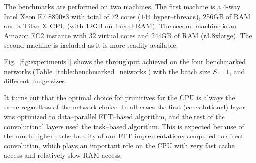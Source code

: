 \documentclass[conference]{./IEEEtran}
\begin{document}
  The benchmarks are performed on two machines.  The first machine is
  a 4-way Intel Xeon E7 8890v3 with total of $72$ cores ($144$
  hyper--threads), 256GB of RAM and a Titan X GPU (with 12GB on--board
  RAM).  The second machine is an Amazon EC2 instance with $32$
  virtual cores and 244GB of RAM (r3.8xlarge).  The second machine is
  included as it is more readily available.

  Fig.~\ref{fig:experiments1} shows the throughput achieved on the
  four benchmarked networks (Table~\ref{table:benchmarked_networks})
  with the batch size $S=1$, and different image sizes.

  It turns out that the optimal choice for primitives for the CPU is
  always the same regardless of the network choice.  In all cases the
  first (convolutional) layer was optimized to data--parallel
  FFT--based algorithm, and the rest of the convolutional layers used
  the task--based algorithm.  This is expected because of the much
  higher cache locality of our FFT implementations compared to direct
  convolution, which plays an important role on the CPU with very fast
  cache access and relatively slow RAM access.


\end{document}
